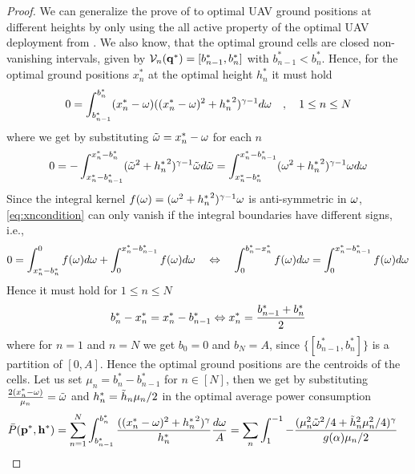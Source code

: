 \documentclass[smallabstract,smallcaptions]{dccpaper}
\newcommand{\Pbar}{\ensuremath{\bar{P}}}         %
\newcommand{\Vor}{\ensuremath{\mathcal{V}}}         %
\begin{document}
\begin{proof}
  We can generalize the prove of  to optimal UAV ground positions at different heights by only
  using the all active property of the optimal UAV deployment from  . We also know, that the
  optimal ground cells are closed non-vanishing intervals, given by $\Vor_n(\vq^*)=[b_{n-1}^*,b_n^*]$ with
  $b^*_{n-1}<b_n^*$.  Hence, for the optimal ground positions $x_n^*$ at the optimal height $h_n^*$ it must hold 
  \begin{align}
    0 = \int^{b^*_n}_{b_{n-1}^*} (x_n^*-\omega) ((x_n^*-\omega)^2+{h^{*}_n}^2)^{\gamma-1}d\omega \quad,\quad 1\leq n\leq
    N\label{eq:vornx_diffh}
  \end{align}
  where we get by substituting ${  \tilde{\omega} }=x_n^*-\omega$ for each $n$ 
  \begin{align}
    0=-\int_{x_n^*-b^*_{n-1}}^{x^*_n-b^*_{n}} ({  \tilde{\omega} }^2+{h^{*}_n}^2)^{\gamma-1}{  \tilde{\omega} } d{  \tilde{\omega} } 
    =\int_{x_n^*-b^*_{n}}^{x_n^*-b^*_{n-1}} (\omega^2+{h^{*}_n}^2)^{\gamma-1}\omega d\omega\label{eq:xncondition}
  \end{align}
  Since the integral kernel $f(\omega)=(\omega^2+{h^{*}_n}^2)^{\gamma-1}\omega$ is  anti-symmetric in $\omega$,
  \eqref{eq:xncondition} can only vanish if the integral boundaries have different signs, i.e.,
  \begin{align}
    0= \int_{x_n^*-b_{n}^*}^0 f(\omega)d\omega + \int_0^{x_n^*-b_{n-1}^*} f(\omega)d\omega 
    \quad    \Leftrightarrow \quad
        \int_0^{b^*_n-x_n^*} f(\omega)d\omega = \int_0^{x_n^*-b^*_{n-1}}f(\omega)d\omega 
  \end{align}
  Hence it must hold  for $1\leq n\leq N$
  \begin{align}
    b^*_{n} -{x^{*}_n}={x^{*}_n}-b^*_{n-1} \Leftrightarrow  {\ensuremath{x^{*}}_n}=\frac{b_{n-1}^*+b_{n}^*}{2}\label{eq:bnoptimal}
  \end{align}
  where for $n=1$ and $n=N$ we get $b_0=0$ and $b_N=A$, since $\{[b^*_{n-1},b_n^*]\}$ is a partition of $[0,A]$. Hence
  the optimal ground positions are the centroids of the cells.  Let us set $\mu_n=b_n^*-b_{n-1}^*$ for $n\in[N]$, then
  we get by substituting $\frac{2(x_n^*-\omega)}{\mu_n}={  \tilde{\omega} }$ and $h^{*}_n=\tilde{h}_n\mu_n/2$  in the optimal average power
  consumption
  \begin{align}
    \Pbar(\vp^*,\vh^*)&=\sum_{n=1}^N \int_{b_{n-1}^*}^{b_n^*} \frac{ ((\pGlob_n-\ome)^2+{\hGlob_n}^2)^{\gam}}{\hGlob_n}\frac{d\ome}{A} 
    = \sum_n \int_{1}^{-1} -\frac{  (\mu_n^2 \tome^2/4 + \tilde{h}_n^2\mu_n^2/4)^{\gam}}{g(\alp)\mu_n/2}

\end{align}
\end{proof}
\end{document}
